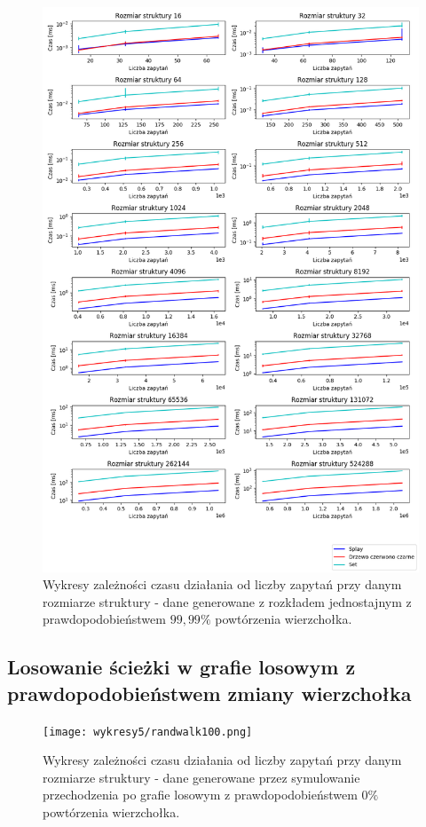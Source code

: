 \documentclass[declaration,shortabstract]{iithesis}
\theoremstyle{thm}
\theoremstyle{remark}
\theoremstyle{plain}
\theoremstyle{plain}
\theoremstyle{plain}
\begin{document}
\begin{figure}[H]  
\centering
    \includegraphics[scale=0.45]{wykresy3/uniform001.png}
      \caption{Wykresy zależności czasu działania od liczby zapytań przy danym rozmiarze struktury - dane generowane z rozkładem jednostajnym z prawdopodobieństwem  \(99,99\%\) powtórzenia wierzchołka. }  
\end{figure}

\subsection{Losowanie ścieżki w grafie losowym z prawdopodobieństwem zmiany wierzchołka}

\begin{figure}[H]  
\centering
    \texttt{[image: wykresy5/randwalk100.png]}
      \caption{Wykresy zależności czasu działania od liczby zapytań przy danym rozmiarze struktury - dane generowane przez symulowanie przechodzenia po grafie losowym z prawdopodobieństwem  \(0\%\) powtórzenia wierzchołka. }  
\end{figure}
\end{document}
